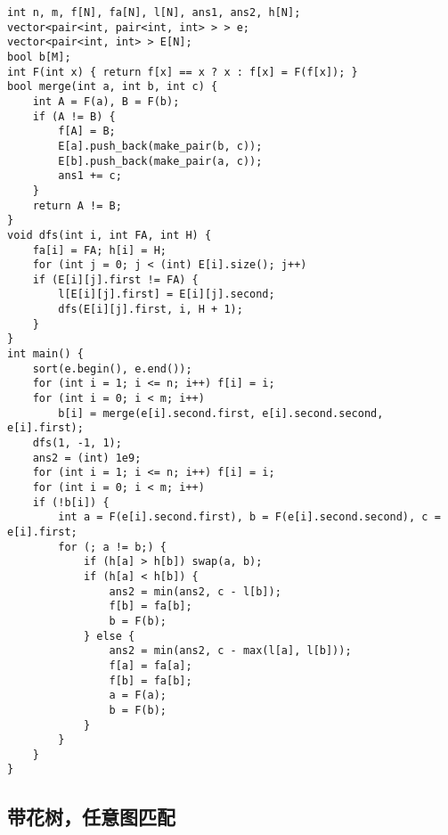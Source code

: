 \documentclass{article}
\begin{document}
\begin{lstlisting}
int n, m, f[N], fa[N], l[N], ans1, ans2, h[N];
vector<pair<int, pair<int, int> > > e;
vector<pair<int, int> > E[N];
bool b[M];
int F(int x) { return f[x] == x ? x : f[x] = F(f[x]); }
bool merge(int a, int b, int c) {
    int A = F(a), B = F(b);
    if (A != B) {
        f[A] = B;
        E[a].push_back(make_pair(b, c));
        E[b].push_back(make_pair(a, c));
        ans1 += c;
    }
    return A != B;
}
void dfs(int i, int FA, int H) {
    fa[i] = FA; h[i] = H;
    for (int j = 0; j < (int) E[i].size(); j++)
    if (E[i][j].first != FA) {
        l[E[i][j].first] = E[i][j].second;
        dfs(E[i][j].first, i, H + 1);
    }
}
int main() {
    sort(e.begin(), e.end());
    for (int i = 1; i <= n; i++) f[i] = i;
    for (int i = 0; i < m; i++)
        b[i] = merge(e[i].second.first, e[i].second.second, e[i].first);
    dfs(1, -1, 1);
    ans2 = (int) 1e9;
    for (int i = 1; i <= n; i++) f[i] = i;
    for (int i = 0; i < m; i++)
    if (!b[i]) {
        int a = F(e[i].second.first), b = F(e[i].second.second), c = e[i].first;
        for (; a != b;) {
            if (h[a] > h[b]) swap(a, b);
            if (h[a] < h[b]) {
                ans2 = min(ans2, c - l[b]);
                f[b] = fa[b];
                b = F(b);
            } else {
                ans2 = min(ans2, c - max(l[a], l[b]));
                f[a] = fa[a];
                f[b] = fa[b];
                a = F(a);
                b = F(b);
            }
        }
    }
}
\end{lstlisting}

\subsection{带花树，任意图匹配}
\end{document}
